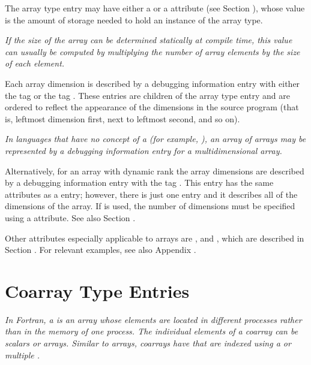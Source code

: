 The array type entry may have either a \DWATbytesize{} or a
\DWATbitsize{} attribute 
(see Section ), 
whose value is the
amount of storage needed to hold an instance of the array type.

\textit{If the size of the array can be determined statically at
compile time, this value can usually be computed by multiplying
the number of array elements by the size of each element.}


Each array dimension is described by a debugging information
entry with either the 
tag \DWTAGsubrangetype{} or the 
tag
\DWTAGenumerationtype. These entries are
children of the
array type entry and are ordered to reflect the appearance of
the dimensions in the source program (that is, leftmost dimension
first, next to leftmost second, and so on).

\textit{In languages that have no concept of a 
 (for example, 
), an array of arrays may
be represented by a debugging information entry for a
multidimensional array.}

Alternatively, for an array with dynamic rank the array dimensions 
are described by a debugging information entry with the tag
\DWTAGgenericsubrangeTARG.
This entry has the same attributes as a
\DWTAGsubrangetype{} entry; however,
there is just one \DWTAGgenericsubrangeNAME{} entry and it describes all of the
dimensions of the array.
If \DWTAGgenericsubrangeNAME{}
is used, the number of dimensions must be specified using a
\DWATrank{} attribute. See also Section
.


Other attributes especially applicable to arrays are
\DWATallocated, 
\DWATassociated{} and 
\DWATdatalocation,
which are described in 
Section . 
For relevant examples, see also Appendix .

\section{Coarray Type Entries}
\label{chap:coarraytypeentries}
\textit{In Fortran, a  is an array whose
elements are located in different processes rather than in the
memory of one process. The individual elements
of a coarray can be scalars or arrays.
Similar to arrays, coarrays have  that are 
indexed using a  or multiple .
}

